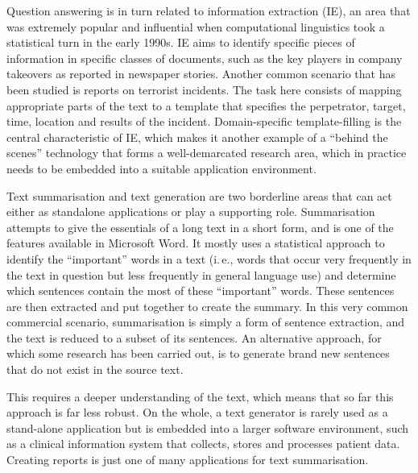 \begin{multicols}{2}

  Question answering is in turn related to information extraction (IE), an area that was extremely popular and influential when computational linguistics took a statistical turn in the early 1990s. IE aims to identify specific pieces of information in specific classes of documents, such as the key players in company takeovers as reported in newspaper stories. Another common scenario that has been studied is reports on terrorist incidents. The task here consists of mapping appropriate parts of the text to a template that specifies the perpetrator, target, time, location and results of the incident. Domain-specific template-filling is the central characteristic of IE, which makes it another example of a “behind the scenes” technology that forms a well-demarcated research area, which in practice needs to be embedded into a suitable application environment. 

      Text summarisation and text generation are two borderline areas that can act either as standalone applications or play a supporting role. Summarisation attempts to give the essentials of a long text in a short form, and is one of the features available in Microsoft Word. It mostly uses a statistical approach to identify the “important” words in a text (i.\,e., words that occur very frequently in the text in question but less frequently in general language use) and determine which sentences contain the most of these “important” words. These sentences are then extracted and put together to create the summary. In this very common commercial scenario, summarisation is simply a form of sentence extraction, and the text is reduced to a subset of its sentences. An alternative approach, for which some research has been carried out, is to generate brand new sentences that do not exist in the source text. 


  This requires a deeper understanding of the text, which means that so far this approach is far less robust. On the whole, a text generator is rarely used as a stand-alone application but is embedded into a larger software environment, such as a clinical information system that collects, stores and processes patient data. Creating reports is just one of many applications for text summarisation. 


\end{multicols}
